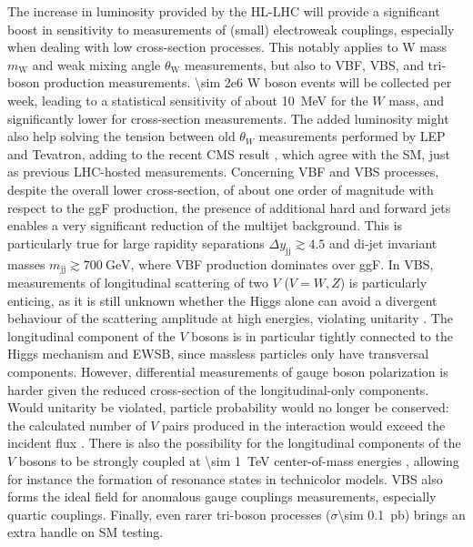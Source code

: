\documentclass[11pt]{article}
\newcommand{\dijetmass}{m_{\text{jj}}}
\newcommand{\dijetrap}{y_{\text{jj}}}
\newcommand{\mw}{m_{\text{W}}}
\newcommand{\thw}{\theta_{\text{W}}}
\begin{document}
The increase in luminosity provided by the \ac{HL-LHC} will provide a significant boost in sensitivity to measurements of (small) electroweak couplings, especially when dealing with low cross-section processes.
This notably applies to W mass \(\mw\) and weak mixing angle \(\thw\) measurements, but also to \ac{VBF}, \ac{VBS}, and tri-boson production measurements.
\num{\sim 2e6} W boson events will be collected per week, leading to a statistical sensitivity of about \SI{10}{\MeV} for the \(W\) mass, and significantly lower for cross-section measurements.
The added luminosity might also help solving the tension between old \(\theta_{W}\) measurements performed by \ac{LEP} and Tevatron, adding to the recent \ac{CMS} result \cite{weak_mixing_angle_cms}, which agree with the \ac{SM}, just as previous \ac{LHC}-hosted measurements.
Concerning \ac{VBF} and \ac{VBS} processes, despite the overall lower cross-section, of about one order of magnitude with respect to the \ac{ggF} production, the presence of additional hard and forward jets enables a very significant reduction of the multijet background.
This is particularly true for large rapidity separations \(\Delta \dijetrap \gtrsim 4.5\) and di-jet invariant masses
\(\dijetmass \gtrsim \SI{700}{\GeV}\), where \ac{VBF} production dominates over \ac{ggF}.
In \ac{VBS}, measurements of longitudinal scattering of two \(V\) (\(V=W,Z\)) is particularly enticing, as it is still unknown whether the Higgs alone can avoid a divergent behaviour of the scattering amplitude at high energies, violating unitarity \cite{vbs2}.
The longitudinal component of the \(V\) bosons is in particular tightly connected to the Higgs mechanism and \ac{EWSB}, since massless particles only have transversal components.
However, differential measurements of gauge boson polarization is harder given the reduced cross-section of the longitudinal-only components.
Would unitarity be violated, particle probability would no longer be conserved: the calculated number of \(V\) pairs produced in the interaction would exceed the incident flux \cite{thomson}.
There is also the possibility for the longitudinal components of the \(V\) bosons to be strongly coupled at \SI{\sim 1}{\TeV} center-of-mass energies \cite{vbs1}, allowing for instance the formation of resonance states in technicolor models.
\ac{VBS} also forms the ideal field for anomalous gauge couplings measurements, especially quartic couplings.
Finally, even rarer tri-boson processes (\(\sigma\)\SI{\sim 0.1}{\pico\barn}) brings an extra handle on \ac{SM} testing.
\end{document}
